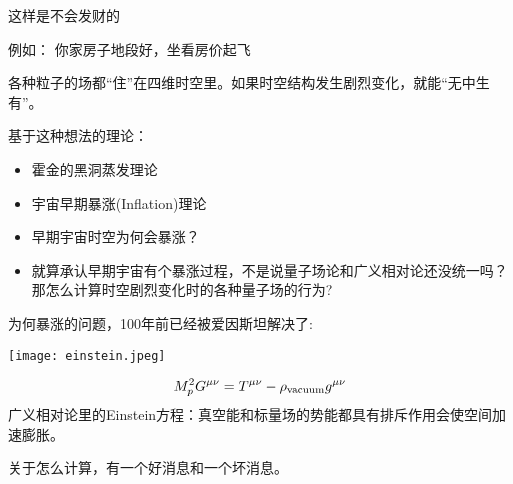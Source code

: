 \documentclass[CJK]{beamer}
\begin{document}
\begin{frame}
\bch


这样是不会发财的

\ech
\end{frame}


\begin{frame}
  \bch
  
  例如： 你家房子地段好，坐看房价起飞
\ech
\end{frame}

\begin{frame}
\bch
各种粒子的场都“住”在四维时空里。如果时空结构发生剧烈变化，就能“无中生有”。

\skipline

基于这种想法的理论：
\begin{itemize}
\item{霍金的黑洞蒸发理论}
\item{宇宙早期暴涨(Inflation)理论}
\end{itemize}
\ech
\end{frame}

\begin{frame}
\bch
\begin{itemize}
\item{早期宇宙时空{\blue \large 为何会暴涨}？}
\item{就算承认早期宇宙有个暴涨过程，不是说量子场论和广义相对论还没统一吗？那{\blue \large 怎么计算}时空剧烈变化时的各种量子场的行为?}
\end{itemize}
\ech
\end{frame}

\begin{frame}
\bch
{\blue 为何暴涨}的问题，100年前已经被{\blue 爱因斯坦解决了}:

\begin{minipage}{0.45\textwidth}
\texttt{[image: einstein.jpeg]}
\end{minipage}
\begin{minipage}{0.45\textwidth}
$$ M_p^2 G^{\mu\nu} =  T^{\mu\nu} - \rho_{\rm vacuum} g^{\mu\nu} $$
广义相对论里的Einstein方程：真空能和标量场的势能都具有排斥作用会使空间加速膨胀。

\end{minipage}
\ech
\end{frame}

\begin{frame}
\bch
关于{\blue 怎么计算}，有一个好消息和一个坏消息。
\ech
\end{frame}
\end{document}
